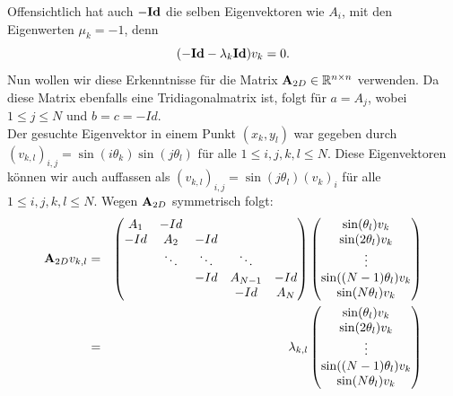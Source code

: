 Offensichtlich hat auch $-{\textbf{Id}}$ die selben Eigenvektoren wie $A_{i}$, mit den Eigenwerten $\mu_{k} = -1$, denn
\begin{equation}
(-{\textbf{Id}} - \lambda_{k}{\textbf{Id}}) v_{k} = 0.
\end{equation}
Nun wollen wir diese Erkenntnisse für die Matrix ${\textbf{A}}_{2D} \in \mathbb{R}^{n \times n}$ verwenden. Da diese Matrix ebenfalls eine Tridiagonalmatrix ist, folgt für $a = A_{j}$, wobei $1 \le j \le N$ und $b = c = -Id$.\\
Der gesuchte Eigenvektor in einem Punkt $(x_{k},y_{l})$ war gegeben durch $(v_{k,l})_{i,j} = \sin(i\theta_{k}) \sin(j\theta_{l})$ für alle $1 \le i,j,k,l \le N$. Diese Eigenvektoren können wir auch auffassen als $(v_{k,l})_{i,j} = \sin(j\theta_{l})(v_{k})_{i}$ für alle $1 \le i,j,k,l \le N$. Wegen ${\textbf{A}}_{2D}$ symmetrisch folgt:
\begin{eqnarray}
{\textbf{A}}_{2D}v_{k,l} &=& 
\begin{pmatrix}
A_{1} & -Id\\
-Id & A_{2} & -Id\\
    & \ddots & \ddots & \ddots\\
   	&		 & -Id    & A_{N-1} & -Id\\
   	&		 &		  & -Id    & A_{N}
\end{pmatrix}
\begin{pmatrix}
\sin(\theta_{l}) v_{k}\\
\sin(2\theta_{l}) v_{k}\\
\vdots\\
\sin((N-1)\theta_{l}) v_{k}\\
\sin(N\theta_{l}) v_{k}\\
\end{pmatrix}\notag\\
&=& \lambda_{k,l}
\begin{pmatrix}
\sin(\theta_{l}) v_{k}\\
\sin(2\theta_{l}) v_{k}\\
\vdots\\
\sin((N-1)\theta_{l}) v_{k}\\
\sin(N\theta_{l}) v_{k}\\
\end{pmatrix}\notag
\end{eqnarray}


